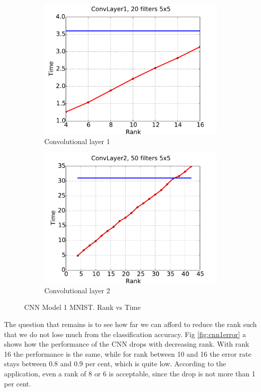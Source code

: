 \begin{figure}[h!]
  \centering
  \begin{subfigure}[b]{0.40\textwidth}
   \includegraphics[width=\textwidth]{images/model1_convL1_time.pdf}
    \caption{Convolutional layer 1}
  \end{subfigure}
  \begin{subfigure}[b]{0.40\textwidth}
    \includegraphics[width=\textwidth]{images/model1_convL2_time.pdf}
    \caption{Convolutional layer 2}
  \end{subfigure}
  \caption{CNN Model 1 MNIST. Rank vs Time}
  \label{fig:cnn1time}
\end{figure}

The question that remains is to see how far we can afford to reduce the rank such that we do not lose much from the classification accuracy. Fig \ref{fig:cnn1error} a shows how the performance of the CNN drops with decreasing rank. With rank 16 the performance is the same, while for rank between 10 and 16 the error rate stays between 0.8 and 0.9 per cent, which is quite low. According to the application, even a rank of 8 or 6 is acceptable, since the drop is not more than 1 per cent.

